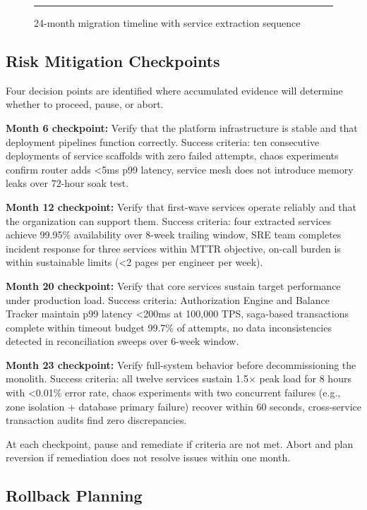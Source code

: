 \begin{figure}[htbp]
\centering
\rule{0.8\textwidth}{0.5\textwidth}
\caption{24-month migration timeline with service extraction sequence}
\label{fig:migration-roadmap}
\end{figure}

\subsection{Risk Mitigation Checkpoints}

Four decision points are identified where accumulated evidence will determine whether to proceed, pause, or abort.

\textbf{Month 6 checkpoint:} Verify that the platform infrastructure is stable and that deployment pipelines function correctly. Success criteria: ten consecutive deployments of service scaffolds with zero failed attempts, chaos experiments confirm router adds <5ms p99 latency, service mesh does not introduce memory leaks over 72-hour soak test.

\textbf{Month 12 checkpoint:} Verify that first-wave services operate reliably and that the organization can support them. Success criteria: four extracted services achieve 99.95\% availability over 8-week trailing window, SRE team completes incident response for three services within MTTR objective, on-call burden is within sustainable limits (<2 pages per engineer per week).

\textbf{Month 20 checkpoint:} Verify that core services sustain target performance under production load. Success criteria: Authorization Engine and Balance Tracker maintain p99 latency <200ms at 100,000 TPS, saga-based transactions complete within timeout budget 99.7\% of attempts, no data inconsistencies detected in reconciliation sweeps over 6-week window.

\textbf{Month 23 checkpoint:} Verify full-system behavior before decommissioning the monolith. Success criteria: all twelve services sustain 1.5× peak load for 8 hours with <0.01\% error rate, chaos experiments with two concurrent failures (e.g., zone isolation + database primary failure) recover within 60 seconds, cross-service transaction audits find zero discrepancies.

At each checkpoint, pause and remediate if criteria are not met. Abort and plan reversion if remediation does not resolve issues within one month.

\subsection{Rollback Planning}

